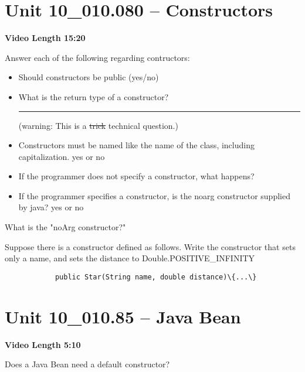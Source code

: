 \documentclass[letterpaper,12pt]{exam}
\newcommand{\unit}{Unit 10}
\begin{document}
\begin{questions}
\section*{\unit\_010.080 -- Constructors} 
\par{\selectfont\textbf{Video Length 15:20}}
\begin{samepage}
    \question Answer each of the following regarding contructors:
      \begin{itemize}
        \item Should constructors be public (yes/no)
        \vspace{5mm}
        \item What is the return type of a constructor? \rule{20mm}{0.35mm} (warning: This is a \st{trick} technical question.)
        \vspace{5mm}
        \item Constructors must be named like the name of the class, including capitalization. yes or no
        \vspace{5mm}
        \item If the programmer does not specify a constructor, what happens?
        \vspace{15mm}
        \item If the programmer specifies a constructor, is the noarg constructor supplied by java? yes or no
        \vspace{5mm}
       \end{itemize}
\end{samepage}

\begin{samepage}
    \question What is the "noArg constructor?"
    \vspace{5mm}
\end{samepage}

\begin{samepage}
    \question Suppose there is a constructor defined as follows.  Write the constructor that sets only a name, and sets the distance to Double.POSITIVE\_INFINITY
    \begin{verbatim}
            public Star(String name, double distance)\{...\}
    \end{verbatim}
    \vspace{5mm}
\end{samepage}


\section*{\unit\_010.85 -- Java Bean} 
\par{\selectfont\textbf{Video Length 5:10}}
\begin{samepage}
    \question Does a Java Bean need a default constructor?  
    \vspace{5mm}
\end{samepage}


\end{questions}
\end{document}
